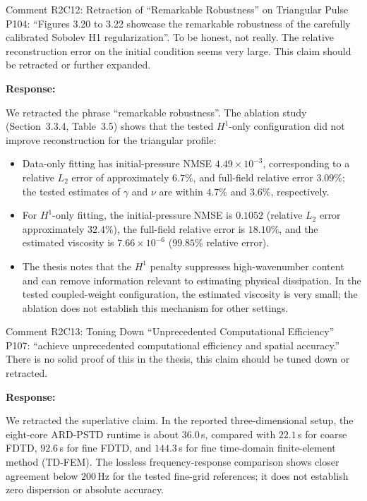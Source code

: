 \documentclass[11pt,a4paper]{article}
\newenvironment{response}{
    \par\vspace{1mm}\noindent\textbf{\textcolor{responseframe}{Response:}}\par\vspace{1mm}
}{
    \par\vspace{3mm}
}
\begin{document}
\begin{revcomment}{Comment R2C12: Retraction of ``Remarkable Robustness'' on Triangular Pulse}
P104: ``Figures 3.20 to 3.22 showcase the remarkable robustness of the carefully calibrated Sobolev H1 regularization''. To be honest, not really. The relative reconstruction error on the initial condition seems very large. This claim should be retracted or further expanded.
\end{revcomment}

\begin{response}
We retracted the phrase ``remarkable robustness''. The ablation study (Section~3.3.4, Table~3.5) shows that the tested $H^1$-only configuration did not improve reconstruction for the triangular profile:
\begin{itemize}
    \item Data-only fitting has initial-pressure NMSE $4.49\times10^{-3}$, corresponding to a relative $L_2$ error of approximately $6.7\%$, and full-field relative error $3.09\%$; the tested estimates of $\gamma$ and $\nu$ are within $4.7\%$ and $3.6\%$, respectively.
    \item For $H^1$-only fitting, the initial-pressure NMSE is $0.1052$ (relative $L_2$ error approximately $32.4\%$), the full-field relative error is $18.10\%$, and the estimated viscosity is $7.66\times10^{-6}$ ($99.85\%$ relative error).
    \item The thesis notes that the $H^1$ penalty suppresses high-wavenumber content and can remove information relevant to estimating physical dissipation. In the tested coupled-weight configuration, the estimated viscosity is very small; the ablation does not establish this mechanism for other settings.
\end{itemize}
\end{response}

\begin{revcomment}{Comment R2C13: Toning Down ``Unprecedented Computational Efficiency''}
P107: ``achieve unprecedented computational efficiency and spatial accuracy.'' There is no solid proof of this in the thesis, this claim should be tuned down or retracted.
\end{revcomment}

\begin{response}
We retracted the superlative claim. In the reported three-dimensional setup, the eight-core ARD-PSTD runtime is about $36.0$\,s, compared with $22.1$\,s for coarse FDTD, $92.6$\,s for fine FDTD, and $144.3$\,s for fine time-domain finite-element method (TD-FEM). The lossless frequency-response comparison shows closer agreement below $200$\,Hz for the tested fine-grid references; it does not establish zero dispersion or absolute accuracy.
\end{response}
\end{document}
